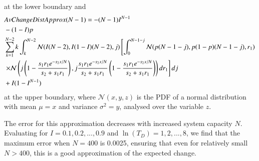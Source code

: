 at the lower boundary and 
\begin{align}
& AvChangeDistApprox(N-1)=-(N-1)I^{N-1}\\
& - (1-I)p \notag \\
& \sum_{k=1}^{N-2}k \int_k^{N-2} \mathcal{N}(I(N-2),I(1-I)(N-2),j) \left[ \int_0^{N-1-j} \mathcal{N}(p(N-1-j),p(1-p)(N-1-j),r_1) \right. \notag \\
& \left. \times \mathcal{N}\left(j\left(1-\frac{s_1r_1 e^{-s_2x/N}}{s_2+s_1r_1}\right),j\frac{s_1r_1 e^{-s_2x/N}}{s_2+s_1r_1}\left(1-\frac{s_1r_1 e^{-s_2x/N}}{s_2+s_1r_1}\right)\right) dr_1 \right] dj \notag \\
&+I(1-I^{N-1})\notag \end{align}
at the upper boundary, where $\mathcal{N}(x,y,z)$ is the PDF of a normal distribution with mean $\mu=x$ and variance $\sigma^2=y$, analysed over the variable $z$.

The error for this approximation decreases with increased system capacity $N$. Evaluating for $I=0.1,0.2,...,0.9$ and $\ln(T_D)=1,2,...,8$, we find that the maximum error when $N=400$ is 0.0025, ensuring that even for relatively small $N>400$, this is a good approximation of the expected change.



\eappendix
